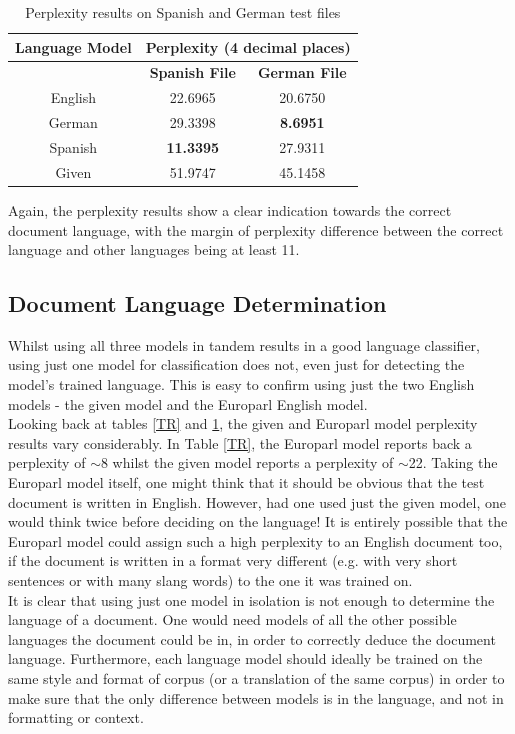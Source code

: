 \documentclass[12pt]{article}
\begin{document}
\begin{table}[H]
	\centering
	\setlength\arrayrulewidth{1pt}
	\caption{\label{SR}Perplexity results on Spanish and German test files }
	\begin{tabular}{c c c}
		\hline
		\textbf{Language Model} & \multicolumn{2}{c}{\textbf{Perplexity (4 decimal places)} }\\
		\hline
		  & \textbf{Spanish File} & \textbf{German File} \\
		\hline                     
		English& 22.6965 & 20.6750\\
		German & 29.3398 & \textbf{8.6951}\\
		Spanish & \textbf{11.3395} & 27.9311\\
		Given & 51.9747& 45.1458\\
	\end{tabular}
\end{table}

Again, the perplexity results show a clear indication towards the correct document language, with the margin of perplexity difference between the correct language and other languages being at least 11. 

\subsection{Document Language Determination}

Whilst using all three models in tandem results in a good language classifier, using just one model for classification does not, even just for detecting the model's trained language.  This is easy to confirm using just the two English models - the given model and the Europarl English model.\\
\hfill\break
Looking back at tables \ref{TR} and \ref{SR}, the given and Europarl model perplexity results vary considerably.  In Table \ref{TR}, the Europarl model reports back a perplexity of $\sim$8 whilst the given model reports a perplexity of $\sim$22.  Taking the Europarl model itself, one might think that it should be obvious that the test document is written in English.  However, had one used just the given model, one would think twice before deciding on the language!  It is entirely possible that the Europarl model could assign such a high perplexity to an English document too, if the document is written in a format very different (e.g. with very short sentences or with many slang words) to the one it was trained on.\\
\hfill\break
It is clear that using just one model in isolation is not enough to determine the language of a document.  One would need models of all the other possible languages the document could be in, in order to correctly deduce the document language.  Furthermore, each language model should ideally be trained on the same style and format of corpus (or a translation of the same corpus) in order to make sure that the only difference between models is in the language, and not in formatting or context.  
\end{document}
